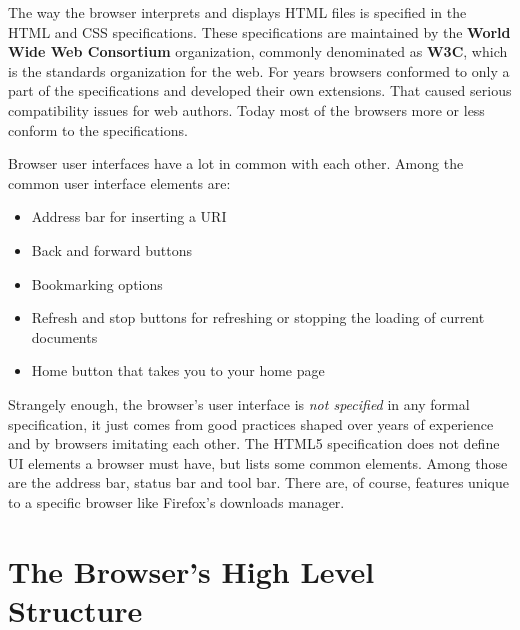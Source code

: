 \documentclass[a4paper, justified, notoc]{tufte-handout} %
\begin{document}
The way the browser interprets and displays HTML files is specified in the HTML and CSS specifications. These specifications are maintained by the \textbf{World Wide Web Consortium} organization, commonly denominated as \textbf{W3C}, which is the standards organization for the web. For years browsers conformed to only a part of the specifications and developed their own extensions. That caused serious compatibility issues for web authors. Today most of the browsers more or less conform to the specifications.

Browser user interfaces have a lot in common with each other. Among the common user interface elements are:
\begin{itemize}
	\item Address bar for inserting a URI
	\item Back and forward buttons
	\item Bookmarking options
	\item Refresh and stop buttons for refreshing or stopping the loading of current documents
	\item Home button that takes you to your home page
\end{itemize}

Strangely enough, the browser's user interface is \emph{not specified} in any formal specification, it just comes from good practices shaped over years of experience and by browsers imitating each other. The HTML5 specification does not define UI elements a browser must have, but lists some common elements. Among those are the address bar, status bar and tool bar. There are, of course, features unique to a specific browser like Firefox's downloads manager.


\section{The Browser's High Level Structure} %
\label{sub:the_browser_s_high_level_structure}
\end{document}
